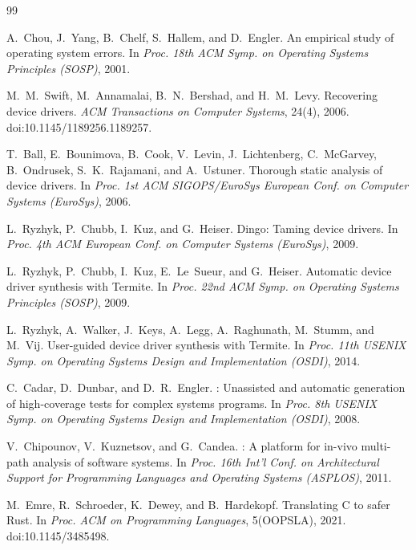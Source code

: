 \begin{thebibliography}{99}
\tiny
\setlength{\itemsep}{0pt}
\setlength{\parsep}{0pt}

A.~Chou, J.~Yang, B.~Chelf, S.~Hallem, and D.~Engler.
\newblock An empirical study of operating system errors.
\newblock In \emph{Proc. 18th ACM Symp. on Operating Systems Principles (SOSP)}, 2001.

M.~M.~Swift, M.~Annamalai, B.~N.~Bershad, and H.~M.~Levy.
\newblock Recovering device drivers.
\newblock \emph{ACM Transactions on Computer Systems}, 24(4), 2006.
\newblock doi:10.1145/1189256.1189257.

T.~Ball, E.~Bounimova, B.~Cook, V.~Levin, J.~Lichtenberg, C.~McGarvey, B.~Ondrusek, S.~K.~Rajamani, and A.~Ustuner.
\newblock Thorough static analysis of device drivers.
\newblock In \emph{Proc. 1st ACM SIGOPS/EuroSys European Conf. on Computer Systems (EuroSys)}, 2006.

L.~Ryzhyk, P.~Chubb, I.~Kuz, and G.~Heiser.
\newblock Dingo: Taming device drivers.
\newblock In \emph{Proc. 4th ACM European Conf. on Computer Systems (EuroSys)}, 2009.

L.~Ryzhyk, P.~Chubb, I.~Kuz, E.~Le~Sueur, and G.~Heiser.
\newblock Automatic device driver synthesis with {Termite}.
\newblock In \emph{Proc. 22nd ACM Symp. on Operating Systems Principles (SOSP)}, 2009.

L.~Ryzhyk, A.~Walker, J.~Keys, A.~Legg, A.~Raghunath, M.~Stumm, and M.~Vij.
\newblock User-guided device driver synthesis with {Termite}.
\newblock In \emph{Proc. 11th USENIX Symp. on Operating Systems Design and Implementation (OSDI)}, 2014.

C.~Cadar, D.~Dunbar, and D.~R.~Engler.
: Unassisted and automatic generation of high-coverage tests for complex systems programs.
\newblock In \emph{Proc. 8th USENIX Symp. on Operating Systems Design and Implementation (OSDI)}, 2008.

V.~Chipounov, V.~Kuznetsov, and G.~Candea.
: A platform for in-vivo multi-path analysis of software systems.
\newblock In \emph{Proc. 16th Int'l Conf. on Architectural Support for Programming Languages and Operating Systems (ASPLOS)}, 2011.

M.~Emre, R.~Schroeder, K.~Dewey, and B.~Hardekopf.
\newblock Translating {C} to safer {Rust}.
\newblock In \emph{Proc. ACM on Programming Languages}, 5(OOPSLA), 2021.
\newblock doi:10.1145/3485498.


\end{thebibliography}
